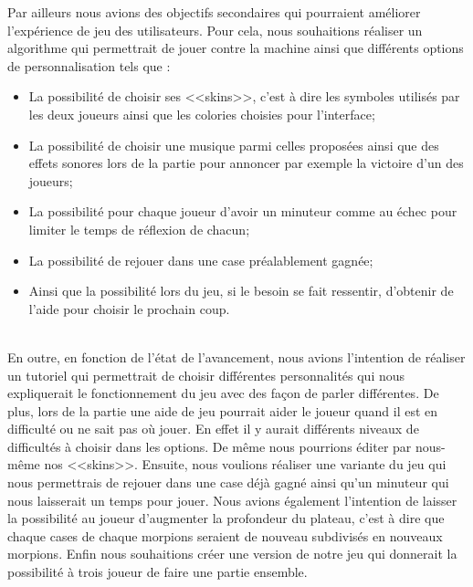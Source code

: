\documentclass[12pt,a4paper]{article}
\begin{document}
    Par ailleurs nous avions des objectifs secondaires qui pourraient améliorer l'expérience de jeu des utilisateurs.
    Pour cela, nous souhaitions réaliser un algorithme qui permettrait de jouer contre la machine ainsi que différents options de personnalisation tels que :\\
    \begin{itemize}
   
    \item La possibilité de choisir ses <<skins>>, c'est à dire les symboles utilisés par les deux joueurs ainsi que les colories choisies pour l'interface;
    \\
	\item La possibilité de choisir une musique parmi celles proposées ainsi que des effets sonores lors de la partie pour annoncer par exemple la victoire d'un des joueurs;
 \\
	\item La possibilité pour chaque joueur d'avoir un minuteur comme au échec pour limiter le temps de réflexion de chacun;
 \\
	\item La possibilité de rejouer dans une case préalablement gagnée;
 \\
    \item Ainsi que la possibilité lors du jeu, si le besoin se fait ressentir, d'obtenir de l'aide pour choisir le prochain coup.
    \end{itemize}
\\
    En outre, en fonction de l'état de l'avancement, nous avions l'intention de réaliser un tutoriel qui permettrait de choisir différentes personnalités qui nous expliquerait le fonctionnement du jeu avec des façon de parler différentes. De plus, lors de la partie une aide de jeu pourrait aider le joueur quand il est en difficulté ou ne sait pas où jouer. En effet il y aurait différents niveaux de difficultés à choisir dans les options.
    De même nous pourrions éditer par nous-même nos <<skins>>.
    Ensuite, nous voulions réaliser une variante du jeu qui nous permettrais de rejouer dans une case déjà gagné ainsi qu'un minuteur qui nous laisserait un temps pour jouer.
	Nous avions également l'intention de laisser la possibilité au joueur d'augmenter la profondeur du plateau, c'est à dire que chaque cases de chaque morpions seraient de nouveau subdivisés en nouveaux morpions.
    Enfin nous souhaitions créer une version de notre jeu qui donnerait la possibilité à trois joueur de faire une partie ensemble.
\end{document}
